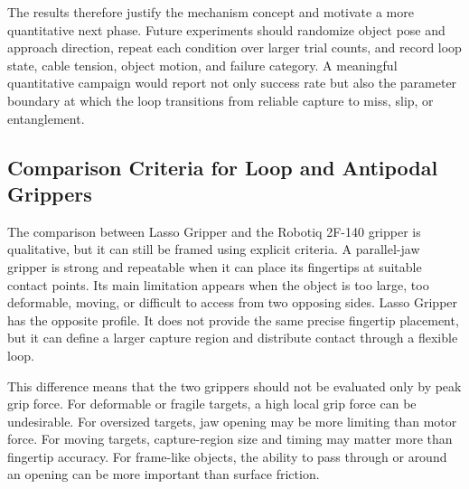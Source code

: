The results therefore justify the mechanism concept and motivate a more quantitative next phase. Future experiments should randomize object pose and approach direction, repeat each condition over larger trial counts, and record loop state, cable tension, object motion, and failure category. A meaningful quantitative campaign would report not only success rate but also the parameter boundary at which the loop transitions from reliable capture to miss, slip, or entanglement.

\subsection{Comparison Criteria for Loop and Antipodal Grippers}

The comparison between Lasso Gripper and the Robotiq 2F-140 gripper is qualitative, but it can still be framed using explicit criteria. A parallel-jaw gripper is strong and repeatable when it can place its fingertips at suitable contact points. Its main limitation appears when the object is too large, too deformable, moving, or difficult to access from two opposing sides. Lasso Gripper has the opposite profile. It does not provide the same precise fingertip placement, but it can define a larger capture region and distribute contact through a flexible loop.

This difference means that the two grippers should not be evaluated only by peak grip force. For deformable or fragile targets, a high local grip force can be undesirable. For oversized targets, jaw opening may be more limiting than motor force. For moving targets, capture-region size and timing may matter more than fingertip accuracy. For frame-like objects, the ability to pass through or around an opening can be more important than surface friction.

